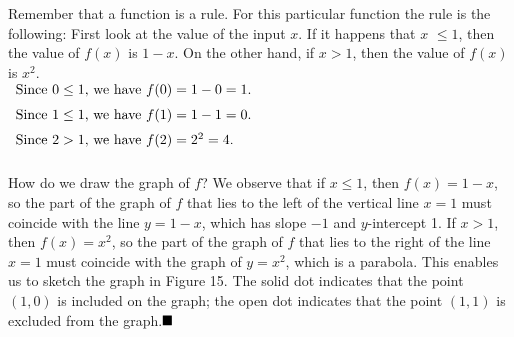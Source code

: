\documentclass{sebase}
\begin{document}
\begin{Solution}
Remember that a function is a rule. For this particular function the rule is
the following: First look at the value of the input $x$. If it happens that $%
x$ $\leq 1$, then the value of $f(x)$ is $1-x$. On the other hand, if $x>1$,
then the value of $f(x)$ is $x^{2}$.\\[6pt]
\hspace*{\fill}$%
\begin{array}{l}
\vspace*{6pt}\text{Since }0\leq 1\text{, we have }f(0)=1-0=1\text{.} \\ 
\vspace*{6pt}\text{Since }1\leq 1\text{, we have }f(1)=1-1=0\text{.} \\ 
\vspace{6pt}\text{Since }2>1\text{, we have }f(2)=2^{2}=4\text{.}%
\end{array}%
$\hspace*{\fill}

How do we draw the graph
of $f$? We observe that if $x\leq 1$, then $f(x)=1-x$, so the part of the
graph of $f$ that lies to the left of the vertical line $x=1$ must coincide
with the line $y=1-x$, which has slope $-1$ and $y$-intercept 1. If $x>1$,
then $f(x)=x^{2}$, so the part of the graph of $f$ that lies to the right of
the line $x=1$ must coincide with the graph of $y=x^{2}$, which is a
parabola. This enables us to sketch the graph in Figure 15. The solid dot
indicates that the point $\left( 1,0\right) $ is included on the graph; the
open dot indicates that the point $\left( 1,1\right) $ is excluded from the
graph.$\vspace{-6pt}\blacksquare $
\end{Solution}
\end{document}
